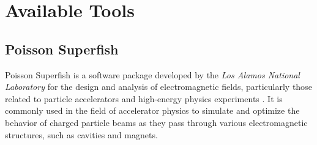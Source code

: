 \documentclass[a4paper,oneside,12pt]{report}
\numberwithin{equation}{chapter}
\begin{document}


\tableofcontents


\newcommand{\vecthreeBF}[1]{\vec{\textbf{#1}}}
\newcommand{\vecthree}[1]{\vec{#1}}

\newcommand{\parDeriv}[2]{\frac{\partial #1}{\partial #2}}
\newcommand{\parDerivS}[2]{\frac{\partial^2 #1}{\partial #2^2}}
\newcommand{\derivS}[2]{\frac{d^2 #1}{d#2^2}}

\newcommand{\dotProdBF}[2]{\vecthreeBF{#1} \cdot \vecthreeBF{#2}}
\newcommand{\dotProd}[2]{\vecthree{#1} \cdot \vecthree{#2}}

\newcommand{\crossProdBF}[2]{\vecthreeBF{#1} \times \vecthreeBF{#2}}
\newcommand{\crossProd}[2]{\vecthree{#1} \times \vecthree{#2}}


\newcommand{\fromeq}[1]{\textit{equation \ref{eq:#1}}}
\newcommand{\fromeqs}[2]{\textit{equations \ref{eq:#1} and \ref{eq:#2}}}
\newcommand{\fromeqsth}[3]{\textit{equations \ref{eq:#1}, \ref{eq:#2} and \ref{eq:#3}}}

\newcommand{\fromfig}[1]{\textit{figure \ref{fig:#1}}}
\newcommand{\fromfigs}[2]{\textit{figures \ref{fig:#1} and \ref{fig:#2}}}

\newcommand{\fromsec}[1]{\textit{section \ref{sec:#1}}}
\newcommand{\fromsecs}[2]{\textit{sections \ref{sec:#1} and \ref{sec:#2}}}

\newcommand{\e}{$\textbf{e}^-$ }
\newcommand{\egun}{$\textbf{e}^-$-gun }
\newcommand{\eB}{$\textbf{e}^-$ - $\vecthreeBF{B}$ }
\newcommand{\eE}{$\textbf{e}^-$ - $\vecthreeBF{E}$ }
\newcommand{\eEM}{$\textbf{e}^-$ - \textbf{EM} }
\newcommand{\ee}{$\textbf{e}^-$ - $\textbf{e}^-$ }


\section{Available Tools}

\subsection{Poisson Superfish}
Poisson Superfish is a software package developed by the \textit{Los Alamos National Laboratory} 
for the design and analysis of electromagnetic fields, particularly those related to particle accelerators and high-energy physics experiments \cite{poi-sup}.
It is commonly used in the field of accelerator physics to simulate and optimize the behavior of charged particle beams as they pass through various electromagnetic structures, such as cavities and magnets.
\end{document}
